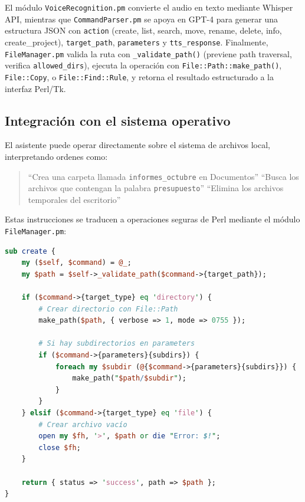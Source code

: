 \documentclass[12pt,a4paper]{report}
\numberwithin{figure}{section}
\begin{document}
\noindent El módulo \texttt{VoiceRecognition.pm} convierte el audio en texto mediante Whisper API, mientras que \texttt{CommandParser.pm} se apoya en GPT-4 para generar una estructura JSON con \texttt{action} (create, list, search, move, rename, delete, info, create\_project), \texttt{target\_path}, \texttt{parameters} y \texttt{tts\_response}.  
Finalmente, \texttt{FileManager.pm} valida la ruta con \texttt{\_validate\_path()} (previene path traversal, verifica \texttt{allowed\_dirs}), ejecuta la operación con \texttt{File::Path::make\_path()}, \texttt{File::Copy}, o \texttt{File::Find::Rule}, y retorna el resultado estructurado a la interfaz Perl/Tk.

\vspace{1em}
\subsection{Integración con el sistema operativo}
\label{subsec:integracion_so}

El asistente puede operar directamente sobre el sistema de archivos local, interpretando ordenes como:
\begin{quote}
    “Crea una carpeta llamada \texttt{informes\_octubre} en Documentos”  
    “Busca los archivos que contengan la palabra \texttt{presupuesto}”  
    “Elimina los archivos temporales del escritorio”  
\end{quote}

Estas instrucciones se traducen a operaciones seguras de Perl mediante el módulo \texttt{FileManager.pm}:

\begin{lstlisting}[style=angelcode,language=Perl,caption={Implementación de FileManager.pm - Método create()}]
sub create {
    my ($self, $command) = @_;
    my $path = $self->_validate_path($command->{target_path});
    
    if ($command->{target_type} eq 'directory') {
        # Crear directorio con File::Path
        make_path($path, { verbose => 1, mode => 0755 });
        
        # Si hay subdirectorios en parameters
        if ($command->{parameters}{subdirs}) {
            foreach my $subdir (@{$command->{parameters}{subdirs}}) {
                make_path("$path/$subdir");
            }
        }
    } elsif ($command->{target_type} eq 'file') {
        # Crear archivo vacío
        open my $fh, '>', $path or die "Error: $!";
        close $fh;
    }
    
    return { status => 'success', path => $path };
}
\end{lstlisting}
\end{document}
